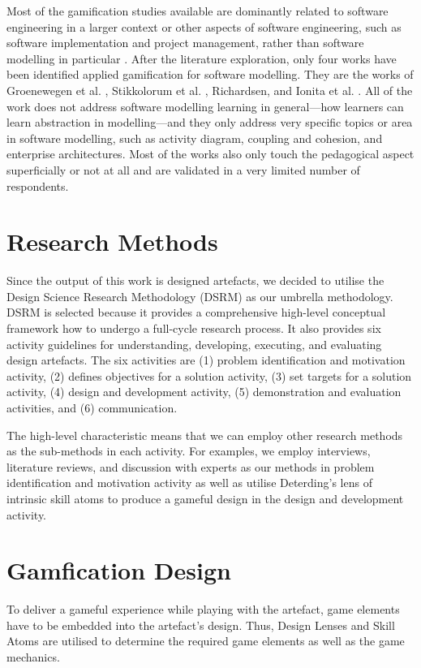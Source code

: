 \documentclass[runningheads,a4paper]{llncs}
\begin{document}
Most of the gamification studies available are dominantly related to software engineering in a larger context or other aspects of software engineering, such as software implementation and project management, rather than software modelling in particular \cite{Pedreira2015}. After the literature exploration, only four works have been identified applied gamification for software modelling. They are the works of Groenewegen et al. \cite{Groenewegen2010}, Stikkolorum et al. \cite{Stikkolorum2014}, Richardsen\cite{Richardsen2014}, and Ionita et al. \cite{Ionita2015}. All of the work does not address software modelling learning in general---how learners can learn abstraction in modelling---and they only address very specific topics or area in software modelling, such as activity diagram, coupling and cohesion, and enterprise architectures. Most of the works also only touch the pedagogical aspect superficially or not at all and are validated in a very limited number of respondents. 

\section{Research Methods}
Since the output of this work is designed artefacts, we decided to utilise the Design Science Research Methodology (DSRM) \cite{peffers2007design} as our umbrella methodology. DSRM is selected because it provides a comprehensive high-level conceptual framework how to undergo a full-cycle research process. It also provides six activity guidelines for understanding, developing, executing, and evaluating design artefacts. The six activities are (1) problem identification and motivation activity, (2) defines objectives for a solution activity, (3) set targets for a solution activity, (4) design and development activity, (5) demonstration and evaluation activities, and (6) communication. 

The high-level characteristic means that we can employ other research methods as the sub-methods in each activity. For examples, we employ interviews, literature reviews, and discussion with experts as our methods in problem identification and motivation activity as well as utilise Deterding's lens of intrinsic skill atoms \cite{deterding2015lens} to produce a gameful design in the design and development activity.

\section{Gamfication Design}
To deliver a gameful experience while playing with the artefact, game elements have to be embedded into the artefact's design. Thus, Design Lenses and Skill Atoms \cite{deterding2015lens} are utilised to determine the required game elements as well as the game mechanics. 
\end{document}
